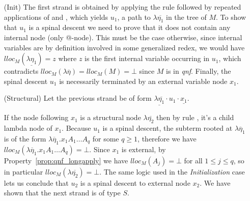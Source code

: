 \documentclass{article}
\theoremstyle{definition}
\begin{document}
\proofatend
\begin{enumerate}
\item[(Init)] The first strand is obtained by applying the rule  followed by repeated applications of  and , which yields $u_1$, a path to $\lambda\overline{\eta_1}$ in the tree of $M$. To show that $u_1$ is a spinal descent we need to prove that it does not contain any internal node (only @-node). This must be the case otherwise, since internal variables are by definition involved in some generalized redex, we would have $lloc_M(\underline{\lambda\eta_1}) = z$ where $z$ is the first internal variable occurring in $u_1$, which contradicts $lloc_M(\lambda \overline{\eta}) = lloc_M(M) = \bot$ since $M$ is in \emph{qnf}. Finally, the spinal descent $u_1$ is necessarily terminated by an external variable node $x_1$.

\item[(Structural)] Let the previous strand be of form $\underline{\lambda\overline{\eta_1}} \cdot u_1 \cdot \underline{x_1} $.

If the node following $x_1$ is a structural node $\lambda\overline{\eta_2}$ then by rule , it's a child lambda node of $x_1$.
Because $u_1$ is a spinal descent, the subterm rooted at $\lambda \overline\eta_1$ is of the form $\lambda \overline\eta_1 . x_1 A_1 \ldots A_q$ for some $q\geq1$, therefore we have $lloc_M(\lambda \overline\eta_1 . x_1 A_1 \ldots A_q) = \bot$. Since $x_1$ is external, by Property~\ref{prop:qnf_longapply} we have $lloc_M(A_j)=\bot$ for all $1\leq j\leq q$, so in particular $lloc_M(\lambda\overline{\eta_2}) = \bot$. The same logic used in the \emph{Initialization} case lets us conclude that $u_2$ is a spinal descent to external node $x_2$. We have shown that the next strand is of type $S$.
\\


\end{enumerate}
\end{document}
